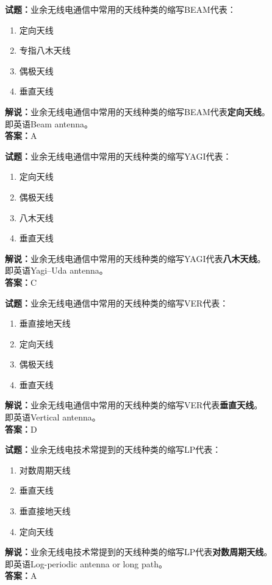 \documentclass{ctexbook}
\begin{document}
\bigskip


\noindent\textbf{试题：}业余无线电通信中常用的天线种类的缩写BEAM代表：
\begin{enumerate}[leftmargin=3em]
\item 定向天线
\item 专指八木天线
\item 偶极天线
\item 垂直天线
\end{enumerate}
\noindent\textbf{解说：}业余无线电通信中常用的天线种类的缩写BEAM代表\textbf{定向天线}。\\即英语Beam antenna。\\\noindent\textbf{答案：}A


\bigskip


\noindent\textbf{试题：}业余无线电通信中常用的天线种类的缩写YAGI代表：
\begin{enumerate}[leftmargin=3em]
\item 定向天线
\item 偶极天线
\item 八木天线
\item 垂直天线
\end{enumerate}
\noindent\textbf{解说：}业余无线电通信中常用的天线种类的缩写YAGI代表\textbf{八木天线}。\\即英语Yagi–Uda antenna。\\\noindent\textbf{答案：}C



\bigskip


\noindent\textbf{试题：}业余无线电通信中常用的天线种类的缩写VER代表：
\begin{enumerate}[leftmargin=3em]
\item 垂直接地天线
\item 定向天线
\item 偶极天线
\item 垂直天线
\end{enumerate}
\noindent\textbf{解说：}业余无线电通信中常用的天线种类的缩写VER代表\textbf{垂直天线}。\\即英语Vertical antenna。\\\noindent\textbf{答案：}D



\bigskip


\noindent\textbf{试题：}业余无线电技术常提到的天线种类的缩写LP代表：
\begin{enumerate}[leftmargin=3em]
\item 对数周期天线
\item 垂直天线
\item 垂直接地天线
\item 定向天线
\end{enumerate}
\noindent\textbf{解说：}业余无线电技术常提到的天线种类的缩写LP代表\textbf{对数周期天线}。\\即英语Log-periodic antenna or long path。\\\noindent\textbf{答案：}A
\end{document}
